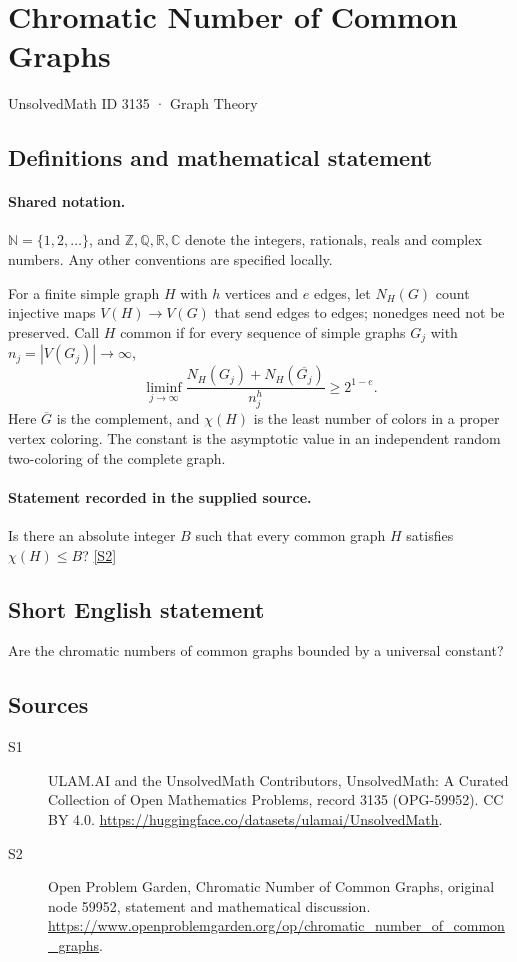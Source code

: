 \documentclass[11pt]{article}
\newcommand{\sref}[2]{\hyperlink{source:#1:#2}{[S#2]}}
\begin{document}
\setcounter{section}{3134}
\section{Chromatic Number of Common Graphs}\label{3135}
{\small\sffamily UnsolvedMath ID 3135 · Graph Theory}
\subsection{Definitions and mathematical statement}

\paragraph{Shared notation.}$\mathbb N=\{1,2,\ldots\}$, and $\mathbb Z,\mathbb Q,\mathbb R,\mathbb C$ denote the integers, rationals, reals and complex numbers. Any other conventions are specified locally.


For a finite simple graph $H$ with $h$ vertices and $e$ edges, let $N_H(G)$ count injective maps $V(H)\to V(G)$ that send edges to edges; nonedges need not be preserved. Call $H$ common if for every sequence of simple graphs $G_j$ with $n_j=|V(G_j)|\to\infty$, \[\liminf_{j\to\infty}\frac{N_H(G_j)+N_H(\overline{G_j})}{n_j^h}\ge 2^{1-e}.\] Here $\overline G$ is the complement, and $\chi(H)$ is the least number of colors in a proper vertex coloring. The constant is the asymptotic value in an independent random two-coloring of the complete graph.
\paragraph{Statement recorded in the supplied source.}
Is there an absolute integer $B$ such that every common graph $H$ satisfies $\chi(H)\le B$? \sref{3135}{2}
\subsection{Short English statement}
Are the chromatic numbers of common graphs bounded by a universal constant?
\subsection{Sources}
\begin{description}
\item[\hypertarget{source:3135:1}{S1}] ULAM.AI and the UnsolvedMath Contributors, UnsolvedMath: A Curated Collection of Open Mathematics Problems, record 3135 (OPG-59952). CC BY 4.0. \url{https://huggingface.co/datasets/ulamai/UnsolvedMath}.
\item[\hypertarget{source:3135:2}{S2}] Open Problem Garden, Chromatic Number of Common Graphs, original node 59952, statement and mathematical discussion. \url{https://www.openproblemgarden.org/op/chromatic_number_of_common_graphs}.
\end{description}
\label{end:3135}
\end{document}

